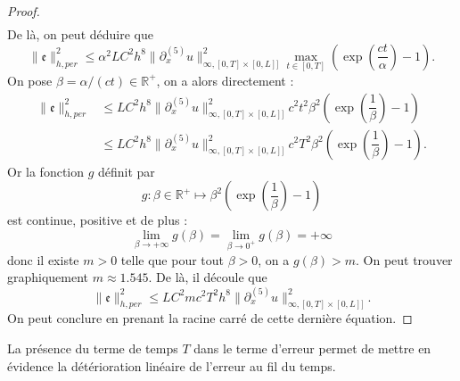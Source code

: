\begin{proof}
\begin{align*}
\end{align*}
De là, on peut déduire que
\begin{equation}
\|\mathfrak{e}\|_{h,per}^2 \leq \alpha^2 L C^2 h^8  \| \partial_x^{(5)} u \|_{\infty,[0,T] \times [0,L]]}^2 \max_{t \in [0,T]} \left( \exp \left( \dfrac{ct}{\alpha} \right) -1  \right).
\end{equation}
On pose $\beta = \alpha/(ct) \in \mathbb{R}^+$, on a alors directement :
\begin{align*}
\|\mathfrak{e}\|_{h,per}^2 & \leq L C^2 h^8  \| \partial_x^{(5)} u \|_{\infty,[0,T] \times [0,L]]}^2 c^2 t^2 \beta^2 \left( \exp \left( \dfrac{1}{\beta} \right) -1  \right) \\
      & \leq L C^2 h^8  \| \partial_x^{(5)} u \|_{\infty,[0,T] \times [0,L]]}^2 c^2 T^2 \beta^2 \left( \exp \left( \dfrac{1}{\beta} \right) -1  \right).
\end{align*}
Or la fonction $g$ définit par
\begin{equation}
g :\beta \in \mathbb{R}^+ \mapsto \beta^2 \left( \exp \left( \dfrac{1}{\beta} \right) -1  \right)
\end{equation}
est continue, positive et de plus :
\begin{equation}
\lim_{\beta \rightarrow + \infty} g(\beta) = \lim_{\beta \rightarrow 0^+} g(\beta) = + \infty
\end{equation}
donc il existe $m > 0$ telle que pour tout $\beta > 0$, on a $g(\beta)>m$. On peut trouver graphiquement $m \approx 1.545$. De là, il découle que
\begin{equation*}
\|\mathfrak{e}\|_{h,per}^2 \leq L C^2 m c^2 T^2 h^8  \| \partial_x^{(5)} u \|_{\infty,[0,T] \times [0,L]]}^2.
\end{equation*}
On peut conclure en prenant la racine carré de cette dernière équation.
\end{proof}

La présence du terme de temps $T$ dans le terme d'erreur permet de mettre en évidence la détérioration linéaire de l'erreur au fil du temps. 


